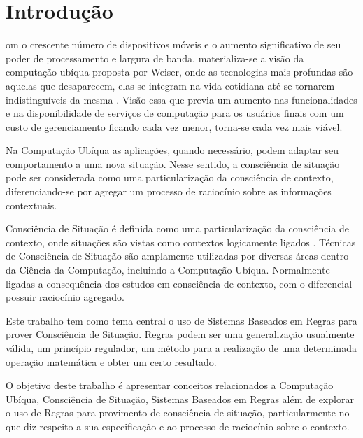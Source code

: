 \documentclass[12pt,a4paper,compsoc]{IEEEtran}
\begin{document}
\maketitle

\section{Introduç\~ao}
  om o crescente número de dispositivos móveis e o aumento significativo de seu
  poder de processamento e largura de banda, materializa-se a visão da computação ubíqua proposta
  por Weiser, onde as tecnologias mais profundas são aquelas que desaparecem, elas se integram na
  vida cotidiana até se tornarem indistinguíveis da mesma \cite{weiser1991}. Visão essa que previa
  um aumento nas funcionalidades e na disponibilidade de serviços de computação para os usuários
  finais com um custo de gerenciamento ficando cada vez menor, torna-se cada vez mais viável.
  
  Na Computação Ubíqua as aplicações, quando necessário, podem adaptar seu comportamento a uma nova
  situação. Nesse sentido, a consciência de situação pode ser considerada como uma particularização
  da consciência de contexto, diferenciando-se por agregar um processo de raciocínio sobre as 
  informações contextuais.

  Consciência de Situação é definida como uma particularização da consciência de contexto, onde
  situações são vistas como contextos logicamente ligados \cite{anagnostopoulos2006}. Técnicas de
  Consciência de Situação são amplamente utilizadas por diversas áreas dentro da Ciência da
  Computação, incluindo a Computação Ubíqua. Normalmente ligadas a consequência dos estudos em
  consciência de contexto, com o diferencial possuir raciocínio agregado.
  
  Este trabalho tem como tema central o uso de Sistemas Baseados em Regras para prover Consciência
  de Situação. Regras podem ser uma generalização usualmente válida, um princípio regulador, um
  método para a realização de uma determinada operação matemática e obter um certo resultado.
  
  O objetivo deste trabalho é apresentar conceitos relacionados a Computação Ubíqua, Consciência de
  Situação, Sistemas Baseados em Regras além de explorar o uso de Regras para provimento de
  consciência de situação, particularmente no que diz respeito a sua especificação e ao processo de
  raciocínio sobre o contexto.
  
\end{document}
